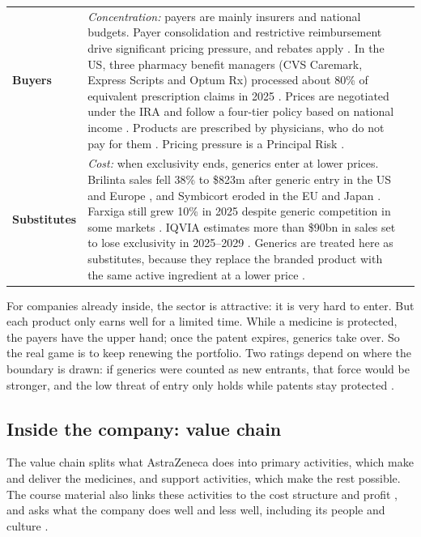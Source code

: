 \begin{xltabular}{\linewidth}{@{}N{2.5cm}Yp{2.3cm}@{}}
\textbf{Buyers} & \textit{Concentration:} payers are mainly insurers and national budgets. Payer consolidation and restrictive reimbursement drive significant pricing pressure, and rebates apply \cite[p.~32]{AR}. In the US, three pharmacy benefit managers (CVS Caremark, Express Scripts and Optum Rx) processed about 80\% of equivalent prescription claims in 2025 \cite{FEIN}. Prices are negotiated under the IRA \cite[p.~33]{AR} and follow a four-tier policy based on national income \cite[p.~41]{AR}. Products are prescribed by physicians, who do not pay for them \cite[p.~32]{AR}. Pricing pressure is a Principal Risk \cite[p.~48]{AR}. &  \\
\textbf{Substitutes} & \textit{Cost:} when exclusivity ends, generics enter at lower prices. Brilinta sales fell 38\% to \$823m after generic entry in the US and Europe \cite[pp.~18, 56]{AR}, and Symbicort eroded in the EU and Japan \cite[p.~20]{AR}. Farxiga still grew 10\% in 2025 despite generic competition in some markets \cite[p.~56]{AR}. IQVIA estimates more than \$90bn in sales set to lose exclusivity in 2025--2029 \cite{IQVIA}. Generics are treated here as substitutes, because they replace the branded product with the same active ingredient at a lower price \cite[p.~24]{PLAN}. &  \\
\end{xltabular}

\begin{analysis}
For companies already inside, the sector is attractive: it is very hard to enter. But each product only earns well for a limited time. While a medicine is protected, the payers have the upper hand; once the patent expires, generics take over. So the real game is to keep renewing the portfolio. Two ratings depend on where the boundary is drawn: if generics were counted as new entrants, that force would be stronger, and the low threat of entry only holds while patents stay protected \cite[p.~49]{AR}.
\end{analysis}

\subsection{Inside the company: value chain}
The value chain splits what AstraZeneca does into primary activities, which make and deliver the medicines, and support activities, which make the rest possible. The course material also links these activities to the cost structure and profit \cite[p.~25]{PLAN}, and asks what the company does well and less well, including its people and culture \cite[p.~26]{PLAN}.


